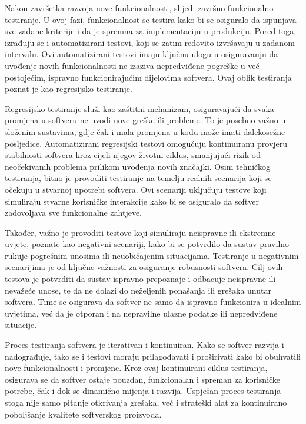 Nakon završetka razvoja nove funkcionalnosti, slijedi završno funkcionalno testiranje.
U ovoj fazi, funkcionalnost se testira kako bi se osiguralo da ispunjava sve zadane kriterije i da je spremna za implementaciju u produkciju.
Pored toga, izrađuju se i automatizirani testovi, koji se zatim redovito izvršavaju u zadanom intervalu.
Ovi automatizirani testovi imaju ključnu ulogu u osiguravanju da uvođenje novih funkcionalnosti ne izaziva nepredviđene pogreške u već postojećim, ispravno funkcionirajućim dijelovima softvera.
Ovaj oblik testiranja poznat je kao regresijsko testiranje.

Regresijsko testiranje služi kao zaštitni mehanizam, osiguravajući da svaka promjena u softveru ne uvodi nove greške ili probleme.
To je posebno važno u složenim sustavima, gdje čak i mala promjena u kodu može imati dalekosežne posljedice.
Automatizirani regresijski testovi omogućuju kontinuiranu provjeru stabilnosti softvera kroz cijeli njegov životni ciklus, smanjujući rizik od neočekivanih problema prilikom uvođenja novih značajki.
Osim tehničkog testiranja, bitno je provoditi testiranje na temelju realnih scenarija koji se očekuju u stvarnoj upotrebi softvera.
Ovi scenariji uključuju testove koji simuliraju stvarne korisničke interakcije kako bi se osiguralo da softver zadovoljava sve funkcionalne zahtjeve.

Također, važno je provoditi testove koji simuliraju neispravne ili ekstremne uvjete, poznate kao negativni scenariji, kako bi se potvrdilo da sustav pravilno rukuje pogrešnim unosima ili neuobičajenim situacijama.
Testiranje u negativnim scenarijima je od ključne važnosti za osiguranje robusnosti softvera.
Cilj ovih testova je potvrditi da sustav ispravno prepoznaje i odbacuje neispravne ili nevažeće unose, te da ne dolazi do neželjenih ponašanja ili grešaka unutar softvera.
Time se osigurava da softver ne samo da ispravno funkcionira u idealnim uvjetima, već da je otporan i na nepravilne ulazne podatke ili nepredviđene situacije.

Proces testiranja softvera je iterativan i kontinuiran.
Kako se softver razvija i nadograđuje, tako se i testovi moraju prilagođavati i proširivati kako bi obuhvatili nove funkcionalnosti i promjene.
Kroz ovaj kontinuirani ciklus testiranja, osigurava se da softver ostaje pouzdan, funkcionalan i spreman za korisničke potrebe, čak i dok se dinamično mijenja i razvija.
Uspješan proces testiranja stoga nije samo pitanje otkrivanja grešaka, već i strateški alat za kontinuirano poboljšanje kvalitete softverskog proizvoda.

